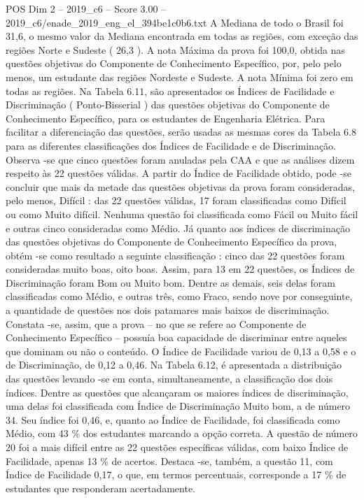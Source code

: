 \begin{textsample}{POS Dim 2 – 2019\_c6 – Score 3.00 – 2019\_c6/enade\_2019\_eng\_el\_394be1c0b6.txt}
A Mediana de todo o Brasil foi 31,6, o mesmo valor da Mediana encontrada em todas as regiões, com exceção das regiões Norte e Sudeste ( 26,3 ).
A nota Máxima da prova foi 100,0, obtida nas questões objetivas do Componente de Conhecimento Específico, por, pelo pelo menos, um estudante das regiões Nordeste e Sudeste.
A nota Mínima foi zero em todas as regiões.
Na Tabela 6.11, são apresentados os Índices de Facilidade e Discriminação ( Ponto-Bisserial ) das questões objetivas do Componente de Conhecimento Específico, para os estudantes de Engenharia Elétrica.
Para facilitar a diferenciação das questões, serão usadas as mesmas cores da Tabela 6.8 para as diferentes classificações dos Índices de Facilidade e de Discriminação.
Observa -se que cinco questões foram anuladas pela CAA e que as análises dizem respeito às 22 questões válidas.
A partir do Índice de Facilidade obtido, pode -se concluir que mais da metade das questões objetivas da prova foram consideradas, pelo menos, Difícil : das 22 questões válidas, 17 foram classificadas como Difícil ou como Muito difícil.
Nenhuma questão foi classificada como Fácil ou Muito fácil e outras cinco consideradas como Médio.
Já quanto aos índices de discriminação das questões objetivas do Componente de Conhecimento Específico da prova, obtém -se como resultado a seguinte classificação : cinco das 22 questões foram consideradas muito boas, oito boas.
Assim, para 13 em 22 questões, os Índices de Discriminação foram Bom ou Muito bom.
Dentre as demais, seis delas foram classificadas como Médio, e outras três, como Fraco, sendo nove por conseguinte, a quantidade de questões nos dois patamares mais baixos de discriminação.
Constata -se, assim, que a prova – no que se refere ao Componente de Conhecimento Específico – possuía boa capacidade de discriminar entre aqueles que dominam ou não o conteúdo.
O Índice de Facilidade variou de 0,13 a 0,58 e o de Discriminação, de 0,12 a 0,46.
Na Tabela 6.12, é apresentada a distribuição das questões levando -se em conta, simultaneamente, a classificação dos dois índices.
Dentre as questões que alcançaram os maiores índices de discriminação, uma delas foi classificada com Índice de Discriminação Muito bom, a de número 34.
Seu índice foi 0,46, e, quanto ao Índice de Facilidade, foi classificada como Médio, com 43 \% dos estudantes marcando a opção correta.
A questão de número 20 foi a mais difícil entre as 22 questões específicas válidas, com baixo Índice de Facilidade, apenas 13 \% de acertos.
Destaca -se, também, a questão 11, com Índice de Facilidade 0,17, o que, em termos percentuais, corresponde a 17 \% de estudantes que responderam acertadamente.

\end{textsample}
